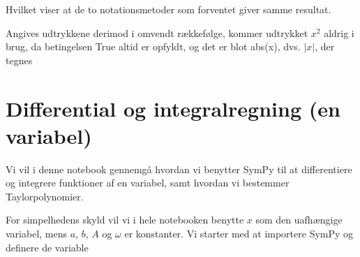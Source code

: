 \documentclass[letterpaper,10pt,english]{jupyterBook}
\begin{document}
\noindent{}

Hvilket viser at de to notationsmetoder som forventet giver samme resultat.

Angives udtrykkene derimod i omvendt rækkefølge, kommer udtrykket \(x^2\) aldrig i brug, da betingelsen True altid er opfyldt, og det er blot abs(x), dvs. \(|x|\), der tegnes

\begin{sphinxVerbatim}[commandchars=\\\{\}]
       

        
\end{sphinxVerbatim}

\noindent{}


\section{Differential\sphinxhyphen{} og integralregning (en variabel)}
\label{\detokenize{notebooks/sympy/Notebook4:differential-og-integralregning-en-variabel}}\label{\detokenize{notebooks/sympy/Notebook4::doc}}
Vi vil i denne notebook gennemgå hvordan vi benytter SymPy til at differentiere og integrere funktioner af en variabel, samt hvordan vi bestemmer Taylorpolynomier.

For simpelhedens skyld vil vi i hele notebooken benytte \(x\) som den uafhængige variabel, mens \(a\), \(b\), \(A\) og \(\omega\) er konstanter. Vi starter med at importere SymPy og definere de variable

\begin{sphinxVerbatim}[commandchars=\\\{\}]
                            
           
                       
\end{sphinxVerbatim}
\end{document}
